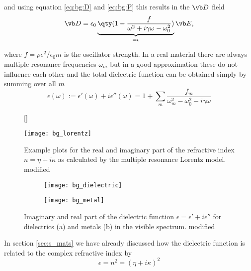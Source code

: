 and using equation \eqref{eq:bg:D} and \eqref{eq:bg:P} this results in the $\vb D$ field
\begin{equation}
    \vb D = 
    \epsilon_0 \underbrace{ 
    \qty(1 - \frac{f}{\omega^2 + i \gamma \omega - \omega_0^2})
    }_{
        =\epsilon
    }
    \vb E,
\end{equation}

where $f = \rho e^2 / \epsilon_0 m$ is the oscillator strength.
In a real material there are always multiple resonance frequencies $\omega_m$ but in a good approximation these do not influence each other and the total dielectric function can be obtained simply by summing over all $m$ \cite{FOMO}
\begin{equation}
    \epsilon(\omega) := 
    \epsilon'(\omega) + i \epsilon''(\omega) = 
    1 + \sum_m \frac{f_m}{\omega_m^2 - \omega_0^2 - i \gamma \omega}
\end{equation}

\begin{figure}[H]
    [\FBwidth]
    {\caption{
        Example plots for the real and imaginary part of the refractive index 
        $n = \eta + i\kappa$
        as calculated by the multiple resonance Lorentz model.
        \cite{FOMO} modified
    }
    \label{fig:bg:lorentz}}
    {\texttt{[image: bg\_lorentz]}}
\end{figure}

\begin{figure}[H]
    \centering
    \begin{subfigure}{.5\textwidth}
        \centering
        \texttt{[image: bg\_dielectric]}
        \caption{}
        \label{fig:bg:dielectric}
    \end{subfigure}%
    \begin{subfigure}{.5\textwidth}
        \centering
        \texttt{[image: bg\_metal]}
        \caption{}
        \label{fig:bg:metal}
    \end{subfigure}
    \caption{Imaginary and real part of the dielectric function 
    $\epsilon = \epsilon' + i \epsilon''$
    for dielectrics (a) and metals (b) in the visible spectrum.
    \cite{FOMO} modified}
    \label{fig:bg:dm}
    \end{figure}

In section \ref{sec:s_mats} we have already discussed how the dielectric function is related to the complex refractive index by
\begin{equation}
    \epsilon = n^2 = (\eta + i \kappa)^2
\end{equation}

